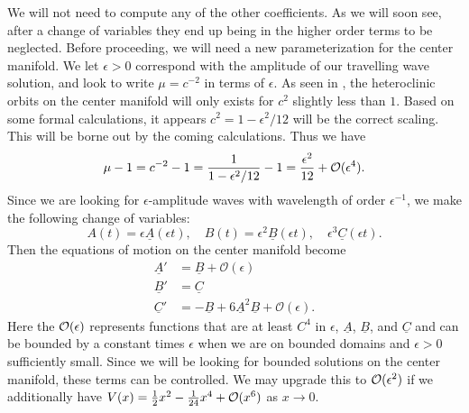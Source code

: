 We will not need to compute any of the other coefficients. As we will soon see, after a change of variables they end up being in the higher order terms to be neglected. Before proceeding, we will need a new parameterization for the center manifold. We let \(\epsilon > 0\) correspond with the amplitude of our travelling wave solution, and look to write \(\mu = c^{-2}\) in terms of \(\epsilon\). As seen in \cite{iooss2000travelling}, the heteroclinic orbits on the center manifold will only exists for \(c^2\) slightly less than \(1\). Based on some formal calculations, it appears \(c^2 = 1 - \epsilon^2/12\) will be the correct scaling. This will be borne out by the coming calculations. Thus we have \[\mu-1 = c^{-2} - 1 = \frac 1 {1-\epsilon^2/12} -1 = \frac {\epsilon^2}{12} +\mathcal{O}(\epsilon^4).\] Since we are looking for \(\epsilon\)-amplitude waves with wavelength of order \(\epsilon^{-1}\), we make the following change of variables:
\begin{equation}
	A(t) = \epsilon \underline A (\epsilon t), \quad B(t) = \epsilon^2 \underline B(\epsilon t), \quad \epsilon^3 \underline C(\epsilon t).
\end{equation}
Then the equations of motion on the center manifold become
\begin{equation}\label{eqns-center-manifold}
\begin{aligned}
	\underline A ' &= \underline B + \mathcal O(\epsilon) \\
	\underline B ' &= \underline C \\
	\underline C ' &= - \underline B + 6 \underline A^2 \underline B + \mathcal O(\epsilon).
\end{aligned}
\end{equation}
Here the \(\mathcal{O}(\epsilon)\) represents functions that are at least \(C^4\) in \(\epsilon\), \(\underline A\), \(\underline B\), and \(\underline C\) and can be bounded by a constant times \(\epsilon\) when we are on bounded domains and \(\epsilon >0\) sufficiently small. Since we will be looking for bounded solutions on the center manifold, these terms can be controlled. We may upgrade this to \(\mathcal{O}(\epsilon^2)\) if we additionally have \(V(x) = \frac 1 2 x^2 - \frac 1 {24} x^4 + \mathcal{O}(x^6)\) as \(x\to 0\).

